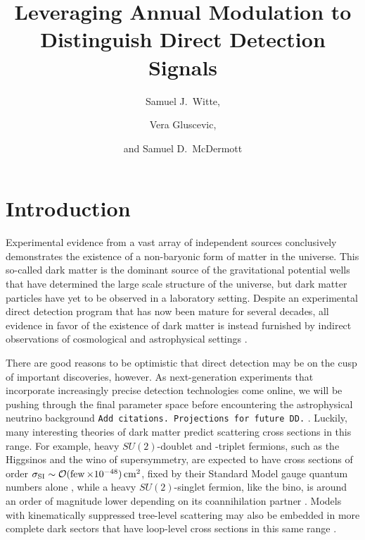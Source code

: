 \documentclass[11pt]{article}
\newcommand{\tenx}[1]{\times 10^{#1}}
\newcommand{\sjwColor}{red}
\newcommand{\sjwtt}[1]{{\color{\sjwColor}\tt #1}}
\begin{document}
\title{Leveraging Annual Modulation to Distinguish Direct Detection Signals}
\author[a,b]{Samuel J.~Witte,}
\author[c]{Vera Gluscevic,}
\author[d]{and Samuel D.~McDermott}






\abstract{


}

\maketitle

\section{Introduction} \setcounter{page}{2}

Experimental evidence from a vast array of independent sources conclusively demonstrates the existence of a non-baryonic form of matter in the universe. This so-called dark matter is the dominant source of the gravitational potential wells that have determined the large scale structure of the universe, but dark matter particles have yet to be observed in a laboratory setting. Despite an experimental direct detection program that has now been mature for several decades, all evidence in favor of the existence of dark matter is instead furnished by indirect observations of cosmological and astrophysical settings \cite{Bauer:2013ihz}.

There are good reasons to be optimistic that direct detection may be on the cusp of important discoveries, however. As next-generation experiments that incorporate increasingly precise detection technologies come online, we will be pushing through the final parameter space before encountering the astrophysical neutrino background \sjwtt{Add citations. Projections for future DD.} \cite{Cushman:2013zza,Billard:2013qya,Ruppin:2014bra,Davis:2014ama,Dent:2016iht}. Luckily, many interesting theories of dark matter predict scattering cross sections in this range. For example, heavy $SU(2)$-doublet and -triplet fermions, such as the Higgsinos and the wino of supersymmetry, are expected to have cross sections of order $\sigma_{\rm SI} \sim \cO(\few\tenx{-48})\cm^2$, fixed by their Standard Model gauge quantum numbers alone \cite{Hill:2011be,Hill:2013hoa,Hill:2014yxa}, while a heavy $SU(2)$-singlet fermion, like the bino, is around an order of magnitude lower depending on its coannihilation partner \cite{Berlin:2015njh}. Models with kinematically suppressed tree-level scattering may also be embedded in more complete dark sectors that have loop-level cross sections in this same range \cite{Ipek:2014gua,McDermott:2014rqa,Appelquist:2015yfa,Appelquist:2015zfa}.
\end{document}
